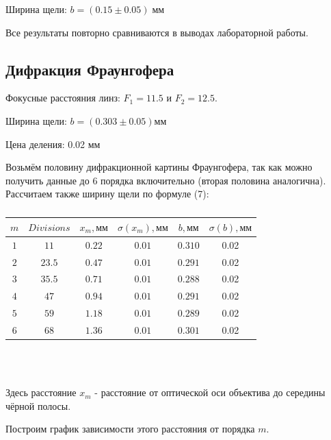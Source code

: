 \documentclass[a4paper, 12pt]{article}
\begin{document}
Ширина щели: $b = (0.15 \pm 0.05)\; \text{мм}$


Все результаты повторно сравниваются в выводах лабораторной работы.

\subsection{Дифракция Фраунгофера}

Фокусные расстояния линз: $F_1 = 11.5$ и $F_2 = 12.5$.

Ширина щели: $b = (0.303 \pm 0.05) \text{мм}$

Цена деления: 0.02 мм

Возьмём половину дифракционной картины Фраунгофера, так как можно получить данные до 6 порядка включительно (вторая половина аналогична). Рассчитаем также ширину щели по формуле (7):

\begin{table}[H]
\begin{center}
\begin{tabular}{|c|c|c|c|c|c|}\hline
$m$ & $Divisions$ & $x_m, \text{мм}$ & $\sigma(x_m), \text{мм}$ & $b, \text{мм}$ & $\sigma(b), \text{мм}$\\\hline
$1$ & $11$  & $0.22$ & $0.01$ & $ 0.310$ & 0.02\\\hline
$2$ & $23.5$ & $0.47$ & $0.01$ & $0.291$ & 0.02\\\hline
$3$ & $35.5$ & $0.71$ & $0.01$ & $0.288$ & 0.02\\\hline
$4$ & $47$ & $0.94$ & $0.01$ & $0.291$ & 0.02\\\hline
$5$ & $59$ & $1.18$ & $0.01$ & $0.289$ & 0.02\\\hline
$6$ & $68$ & $1.36$ & $0.01$ & $0.301$ & 0.02\\\hline
\end{tabular}\\~\\
\end{center}
\caption{\label{tab:second}}
\end{table}

Здесь расстояние $x_m$ - расстояние от оптической оси объектива до середины чёрной полосы.

Построим график зависимости этого расстояния от порядка $m$.
\end{document}
